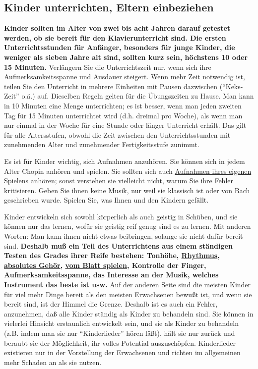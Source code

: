 \subsection{Kinder unterrichten, Eltern einbeziehen}\hypertarget{c1iii16b}{}

\textbf{Kinder sollten im Alter von zwei bis acht Jahren darauf getestet werden, ob sie bereit für den Klavierunterricht sind.
Die ersten Unterrichtsstunden für Anfänger, besonders für junge Kinder, die weniger als sieben Jahre alt sind, sollten kurz sein, höchstens 10 oder 15 Minuten.}
Verlängern Sie die Unterrichtszeit nur, wenn sich ihre Aufmerksamkeitsspanne und Ausdauer steigert.
Wenn mehr Zeit notwendig ist, teilen Sie den Unterricht in mehrere Einheiten mit Pausen dazwischen (\enquote{Keks-Zeit} o.ä.) auf.
Dieselben Regeln gelten für die Übungszeiten zu Hause.
Man kann in 10 Minuten eine Menge unterrichten; es ist besser, wenn man jeden zweiten Tag für 15 Minuten unterrichtet wird (d.h. dreimal pro Woche), als wenn man nur einmal in der Woche für eine Stunde oder länger Unterricht erhält.
Das gilt für alle Altersstufen, obwohl die Zeit zwischen den Unterrichtsstunden mit zunehmenden Alter und zunehmender Fertigkeitsstufe zunimmt.

Es ist für Kinder wichtig, sich Aufnahmen anzuhören.
Sie können sich in jedem Alter Chopin anhören und spielen.
Sie sollten sich auch \hyperlink{c1iii13}{Aufnahmen ihres eigenen Spielens} anhören; sonst verstehen sie vielleicht nicht, warum Sie ihre Fehler kritisieren.
Geben Sie ihnen keine Musik, nur weil sie klassisch ist oder von Bach geschrieben wurde.
Spielen Sie, was Ihnen und den Kindern gefällt.

Kinder entwickeln sich sowohl körperlich als auch geistig in Schüben, und sie können nur das lernen, wofür sie geistig reif genug sind es zu lernen.
Mit anderen Worten: Man kann ihnen nicht etwas beibringen, solange sie nicht dafür bereit sind.
\textbf{Deshalb muß ein Teil des Unterrichtens aus einem ständigen Testen des Grades ihrer Reife bestehen:
Tonhöhe, \hyperlink{c1iii1b}{Rhythmus}, \hyperlink{c1iii12}{absolutes Gehör}, \hyperlink{c1iii11}{vom Blatt spielen}, Kontrolle der Finger, Aufmerksamkeitsspanne, das Interesse an der Musik, welches Instrument das beste ist usw.}
Auf der anderen Seite sind die meisten Kinder für viel mehr Dinge bereit als den meisten Erwachsenen bewußt ist, und wenn sie bereit sind, ist der Himmel die Grenze.
Deshalb ist es auch ein Fehler, anzunehmen, daß alle Kinder ständig als Kinder zu behandeln sind.
Sie können in vielerlei Hinsicht erstaunlich entwickelt sein, und sie als Kinder zu behandeln (z.B. indem man sie nur \enquote{Kinderlieder} hören läßt), hält sie nur zurück und beraubt sie der Möglichkeit, ihr volles Potential auszuschöpfen.
Kinderlieder existieren nur in der Vorstellung der Erwachsenen und richten im allgemeinen mehr Schaden an als sie nutzen.

